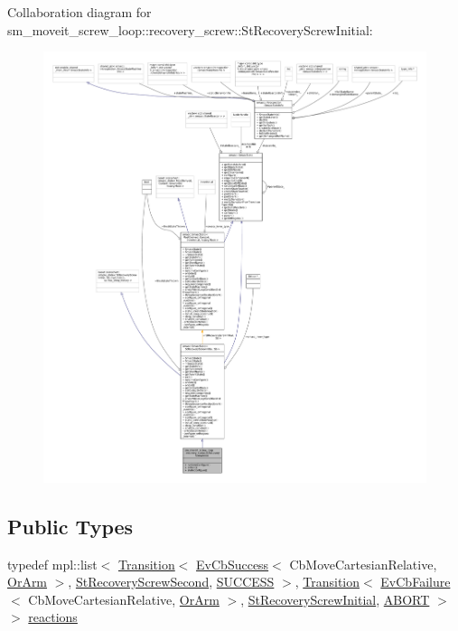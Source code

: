 Collaboration diagram for sm\+\_\+moveit\+\_\+screw\+\_\+loop\+:\+:recovery\+\_\+screw\+:\+:St\+Recovery\+Screw\+Initial\+:
\nopagebreak
\begin{figure}[H]
\begin{center}
\leavevmode
\includegraphics[width=350pt]{structsm__moveit__screw__loop_1_1recovery__screw_1_1StRecoveryScrewInitial__coll__graph}
\end{center}
\end{figure}
\subsection*{Public Types}
\begin{DoxyCompactItemize}
\item 
typedef mpl\+::list$<$ \hyperlink{classsmacc_1_1Transition}{Transition}$<$ \hyperlink{structsmacc_1_1EvCbSuccess}{Ev\+Cb\+Success}$<$ Cb\+Move\+Cartesian\+Relative, \hyperlink{classsm__moveit__screw__loop_1_1OrArm}{Or\+Arm} $>$, \hyperlink{structsm__moveit__screw__loop_1_1recovery__screw_1_1StRecoveryScrewSecond}{St\+Recovery\+Screw\+Second}, \hyperlink{structsmacc_1_1default__transition__tags_1_1SUCCESS}{S\+U\+C\+C\+E\+SS} $>$, \hyperlink{classsmacc_1_1Transition}{Transition}$<$ \hyperlink{structsmacc_1_1EvCbFailure}{Ev\+Cb\+Failure}$<$ Cb\+Move\+Cartesian\+Relative, \hyperlink{classsm__moveit__screw__loop_1_1OrArm}{Or\+Arm} $>$, \hyperlink{structsm__moveit__screw__loop_1_1recovery__screw_1_1StRecoveryScrewInitial}{St\+Recovery\+Screw\+Initial}, \hyperlink{structsmacc_1_1default__transition__tags_1_1ABORT}{A\+B\+O\+RT} $>$ $>$ \hyperlink{structsm__moveit__screw__loop_1_1recovery__screw_1_1StRecoveryScrewInitial_acb420575351e75972d5c36331e7e0828}{reactions}
\end{DoxyCompactItemize}
